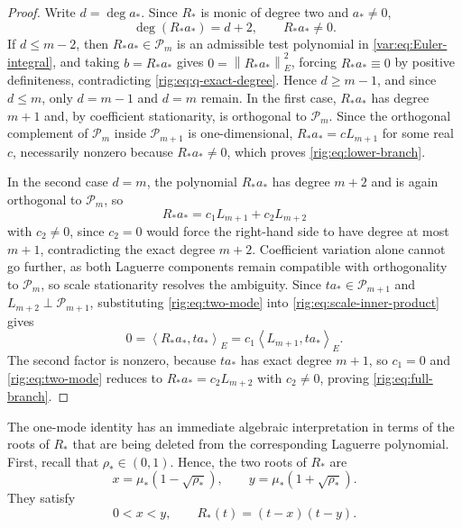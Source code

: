 \documentclass[11pt]{article}
\numberwithin{equation}{section}
\theoremstyle{definition}
\theoremstyle{remark}
\newcommand{\Pcal}{\mathcal P}
\newcommand{\Lag}{L}
\newcommand{\normw}[1]{\left\lVert #1\right\rVert_{E}}
\newcommand{\ip}[2]{\left\langle #1,#2\right\rangle_{E}}
\begin{document}
\begin{proof}
Write \(d=\deg a_*\). Since \(R_*\) is monic of degree two and \(a_*\neq0\),
\begin{equation}\label{rig:eq:q-exact-degree}
    \deg(R_*a_*)=d+2,
    \qquad
    R_*a_*\neq0.
\end{equation}
If \(d\leq m-2\), then \(R_*a_*\in\Pcal_m\) is an admissible test polynomial in \eqref{var:eq:Euler-integral}, and taking \(b=R_*a_*\) gives \(0=\normw{R_*a_*}^2\), forcing \(R_*a_*\equiv0\) by positive definiteness, contradicting \eqref{rig:eq:q-exact-degree}. Hence \(d\geq m-1\), and since \(d\leq m\), only \(d=m-1\) and \(d=m\) remain. In the first case, \(R_*a_*\) has degree \(m+1\) and, by coefficient stationarity, is orthogonal to \(\Pcal_m\). Since the orthogonal complement of \(\Pcal_m\) inside \(\Pcal_{m+1}\) is one-dimensional, \(R_*a_*=c\Lag_{m+1}\) for some real \(c\), necessarily nonzero because \(R_*a_*\neq0\), which proves \eqref{rig:eq:lower-branch}.

In the second case \(d=m\), the polynomial \(R_*a_*\) has degree \(m+2\) and is again orthogonal to \(\Pcal_m\), so
\begin{equation}\label{rig:eq:two-mode}
    R_*a_*=c_1\Lag_{m+1}+c_2\Lag_{m+2}
\end{equation}
with \(c_2\neq0\), since \(c_2=0\) would force the right-hand side to have degree at most \(m+1\), contradicting the exact degree \(m+2\). Coefficient variation alone cannot go further, as both Laguerre components remain compatible with orthogonality to \(\Pcal_m\), so scale stationarity resolves the ambiguity. Since \(ta_*\in\Pcal_{m+1}\) and \(\Lag_{m+2}\perp\Pcal_{m+1}\), substituting \eqref{rig:eq:two-mode} into \eqref{rig:eq:scale-inner-product} gives
\[
    0=\ip{R_*a_*}{ta_*}=c_1\ip{\Lag_{m+1}}{ta_*}.
\]
The second factor is nonzero, because \(ta_*\) has exact degree \(m+1\), so \(c_1=0\) and \eqref{rig:eq:two-mode} reduces to \(R_*a_*=c_2\Lag_{m+2}\) with \(c_2\neq0\), proving \eqref{rig:eq:full-branch}.
\end{proof}

The one-mode identity has an immediate algebraic interpretation in terms of the roots of $R_*$ that are being deleted from the corresponding Laguerre polynomial. First, recall that $\rho_*\in (0,1)$. Hence, the two roots of \(R_*\) are
\begin{equation}\label{rig:eq:R-roots}
    x=\mu_*(1-\sqrt{\rho_*}),
    \qquad
    y=\mu_*(1+\sqrt{\rho_*}).
\end{equation}
They satisfy
\[
    0<x<y,
    \qquad
    R_*(t)=(t-x)(t-y).
\]
\end{document}
